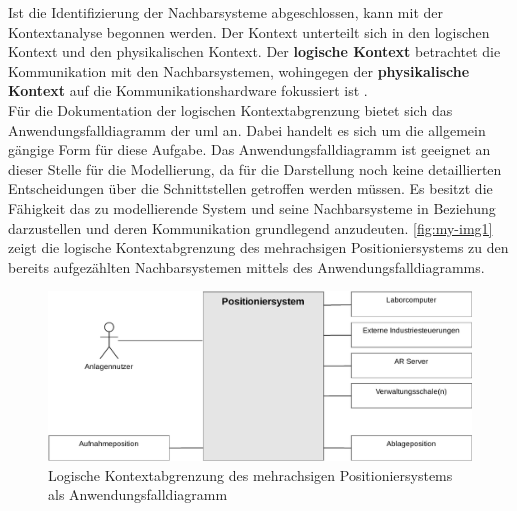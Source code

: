 \documentclass[../../../Bachelorarbeit.tex]{subfiles}
\begin{document}
Ist die Identifizierung der Nachbarsysteme abgeschlossen, kann mit der Kontextanalyse begonnen werden. Der Kontext unterteilt sich in den logischen Kontext und den physikalischen Kontext. Der \textbf{logische Kontext} betrachtet die Kommunikation mit den Nachbarsystemen, wohingegen der \textbf{physikalische Kontext} auf die Kommunikationshardware fokussiert ist \cite[45]{Broy2021}.\\
Für die Dokumentation der logischen Kontextabgrenzung bietet sich das Anwendungsfalldiagramm der \ac{uml} an. Dabei handelt es sich um die allgemein gängige Form für diese Aufgabe. Das Anwendungsfalldiagramm ist geeignet an dieser Stelle für die Modellierung, da für die Darstellung noch keine detaillierten Entscheidungen über die Schnittstellen getroffen werden müssen. Es besitzt die Fähigkeit das zu modellierende System und seine Nachbarsysteme in Beziehung darzustellen und deren Kommunikation grundlegend anzudeuten. \autoref{fig:my-img1} zeigt die logische Kontextabgrenzung des mehrachsigen Positioniersystems zu den bereits aufgezählten Nachbarsystemen mittels des Anwendungsfalldiagramms.

\begin{figure}[H]
    \centering
    \includegraphics[width=\textwidth]{Images/kontextana.pdf}
    \caption[Logische Kontextabgrenzung]{Logische Kontextabgrenzung des mehrachsigen Positioniersystems als Anwendungsfalldiagramm}
    \label{fig:my-img1}
\end{figure}
\end{document}
